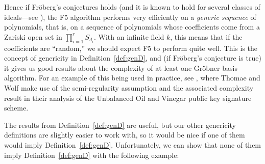\documentclass[11pt]{article}
\theoremstyle{definition}
\begin{document}
Hence if Fröberg's conjectures holds (and it is known to hold for several classes of ideals---see \cite{TRUNG201979}), the F5 algorithm performs very efficiently on a \emph{generic sequence} of polynomials, that is, on a sequence of polynomials whose coefficients come from a Zariski open set in $\prod_{i = 1}^r S_{d_i}$. With an infinite field $k$, this means that if the coefficients are ``random,'' we should expect F5 to perform quite well. This is the concept of genericity in Definition~\ref{def:genD}, and (if Fröberg's conjecture is true) it gives us good results about the complexity of at least one Gröbner basis algorithm. For an example of this being used in practice, see \cite{thomae2012solving}, where Thomae and Wolf make use of the semi-regularity assumption and the associated complexity result in their analysis of the Unbalanced Oil and Vinegar public key signature scheme. 

The results from Definition~\ref{def:genD} are useful, but our other genericity definitions are slightly easier to work with, so it would be nice if one of them would imply Definition~\ref{def:genD}. Unfortunately, we can show that none of them imply Definition~\ref{def:genD} with the following example:
\end{document}
